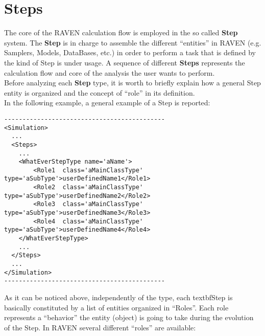\section{Steps  \\ \vspace{2 mm} {\small }}
\label{sec:steps}
The core of the RAVEN calculation flow is employed in the so called \textbf{Step} system. The \textbf{Step} is in charge to assemble the different ``entities'' in RAVEN (e.g. Samplers, Models, DataBases, etc.) in order to perform a task that is defined by the kind of Step is under usage. A sequence of different \textbf{Steps} represents the calculation flow and core of the analysis the user wants to perform. 
\\Before analyzing each \textbf{Step} type, it is worth to briefly explain how a general Step entity is organized and the concept of ``role'' in its definition.
\\In the following example, a general example of a Step is reported:
\begin{lstlisting}[style=XML]
--------------------------------------------
<Simulation>
  ...
  <Steps>
    ...
    <WhatEverStepType name='aName'>
        <Role1  class='aMainClassType'     type='aSubType'>userDefinedName1</Role1>
        <Role2  class='aMainClassType'     type='aSubType'>userDefinedName2</Role2>
        <Role3  class='aMainClassType'     type='aSubType'>userDefinedName3</Role3>
        <Role4  class='aMainClassType'     type='aSubType'>userDefinedName4</Role4>
    </WhatEverStepType>
    ...
  </Steps>
  ...
</Simulation>
--------------------------------------------
\end{lstlisting}
As it can be noticed above, independently of the type, each textbf{Step}  is basically constituted by a list of entities organized in ``Roles''.  Each role represents a ``behavior'' the entity (object) is going to take during the evolution of the Step.
In RAVEN several different ``roles'' are available:
